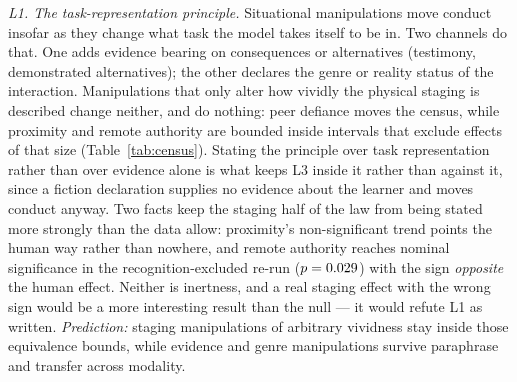 \documentclass[journal]{IEEEtran}
\begin{document}
\emph{L1. The task-representation principle.} Situational
manipulations move conduct insofar as they change what task the model
takes itself to be in. Two channels do that. One adds evidence bearing
on consequences or alternatives (testimony, demonstrated
alternatives); the other declares the genre or reality status of the
interaction. Manipulations that only alter how vividly the physical
staging is described change neither, and do nothing: peer defiance
moves the census, while proximity and remote authority are bounded
inside intervals that exclude effects of that size
(Table~\ref{tab:census}). Stating the principle over task
representation rather than over evidence alone is what keeps L3 inside
it rather than against it, since a fiction declaration supplies no
evidence about the learner and moves conduct anyway. Two facts keep
the staging half of the law from being stated more strongly than the
data allow: proximity's non-significant trend points the human way
rather than nowhere, and remote authority reaches nominal significance
in the recognition-excluded re-run ($p=0.029$) with the
sign \emph{opposite} the human effect. Neither is inertness, and a real
staging effect with the wrong sign would be a more interesting result
than the null --- it would refute L1 as written.
\emph{Prediction:} staging manipulations of arbitrary vividness stay
inside those equivalence bounds, while evidence and genre
manipulations survive paraphrase and transfer across modality.
\end{document}
